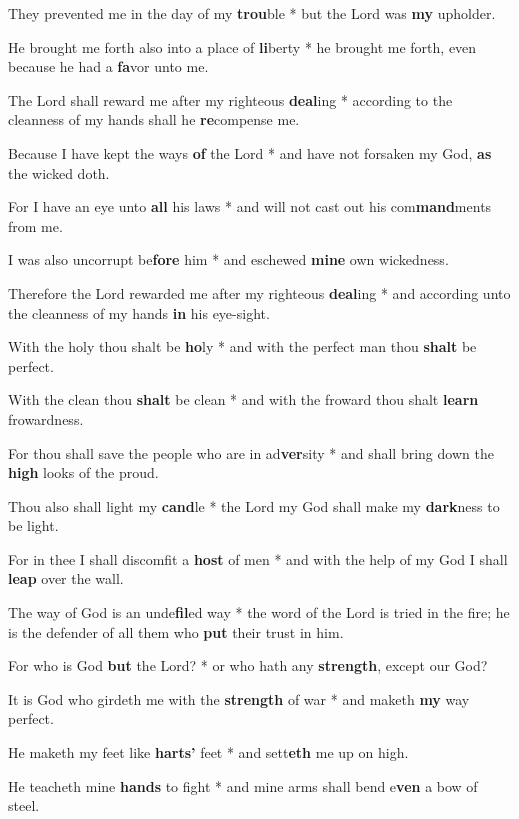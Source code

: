 \begin{multicols}{2}
	They prevented me in the day of my \textbf{trou}ble * but the Lord was \textbf{my} upholder.
	
	He brought me forth also into a place of \textbf{li}berty * he brought me forth, even because he had a \textbf{fa}vor unto me.
	
	The Lord shall reward me after my righteous \textbf{deal}ing * according to the cleanness of my hands shall he \textbf{re}compense me.
	
	Because I have kept the ways \textbf{of} the Lord * and have not forsaken my God, \textbf{as} the wicked doth.
	
	For I have an eye unto \textbf{all} his laws * and will not cast out his com\textbf{mand}ments from me.
	
	I was also uncorrupt be\textbf{fore} him * and eschewed \textbf{mine} own wickedness.
	
	Therefore the Lord rewarded me after my righteous \textbf{deal}ing * and according unto the cleanness of my hands \textbf{in} his eye-sight.
	
	With the holy thou shalt be \textbf{ho}ly * and with the perfect man thou \textbf{shalt} be perfect.
	
	With the clean thou \textbf{shalt} be clean * and with the froward thou shalt \textbf{learn} frowardness.
	
	For thou shall save the people who are in ad\textbf{ver}sity * and shall bring down the \textbf{high} looks of the proud.
	
	Thou also shall light my \textbf{cand}le * the Lord my God shall make my \textbf{dark}ness to be light.
	
	For in thee I shall discomfit a \textbf{host} of men * and with the help of my God I shall \textbf{leap} over the wall.
	
	The way of God is an unde\textbf{fil}ed way * the word of the Lord is tried in the fire; he is the defender of all them who \textbf{put} their trust in him.
	
	For who is God \textbf{but} the Lord? * or who hath any \textbf{strength}, except our God?
	
	It is God who girdeth me with the \textbf{strength} of war * and maketh \textbf{my} way perfect.
	
	He maketh my feet like \textbf{harts' }feet * and sett\textbf{eth} me up on high.
	
	He teacheth mine \textbf{hands} to fight * and mine arms shall bend e\textbf{ven }a bow of steel.
	

\end{multicols}
